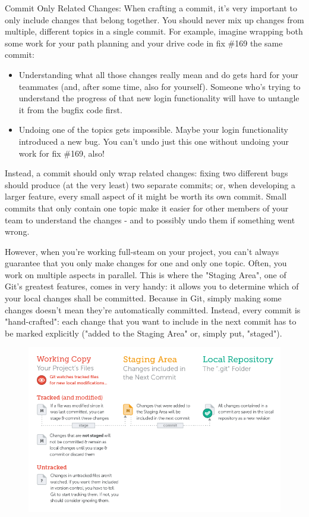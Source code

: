 \documentclass{article}
\begin{document}
 \begin{golden-rule}Commit Only Related Changes:
 \newline\newline
When crafting a commit, it's very important to only include changes that belong together. You should never mix up changes from multiple, different topics in a single commit. For example, imagine wrapping both some work for your path planning and your drive code in fix \#169 the same commit:
\begin{itemize}
    \item Understanding what all those changes really mean and do gets hard for your teammates (and, after some time, also for yourself). Someone who's trying to understand the progress of that new login functionality will have to untangle it from the bugfix code first.
    \item Undoing one of the topics gets impossible. Maybe your login functionality introduced a new bug. You can't undo just this one without undoing your work for fix \#169, also!
\end{itemize}
Instead, a commit should only wrap related changes: fixing two different bugs should produce (at the very least) two separate commits; or, when developing a larger feature, every small aspect of it might be worth its own commit.
Small commits that only contain one topic make it easier for other members of your team to understand the changes - and to possibly undo them if something went wrong.
 \end{golden-rule}
However, when you're working full-steam on your project, you can't always guarantee that you only make changes for one and only one topic. Often, you work on multiple aspects in parallel.
 \newline\newline
This is where the "Staging Area", one of Git's greatest features, comes in very handy: it allows you to determine which of your local changes shall be committed. Because in Git, simply making some changes doesn't mean they're automatically committed. Instead, every commit is "hand-crafted": each change that you want to include in the next commit has to be marked explicitly ("added to the Staging Area" or, simply put, "staged").
\begin{figure}[h]
    \centering
    \includegraphics[width=4.5in]{images/staging-area-file-status.png}
\end{figure}
\end{document}
